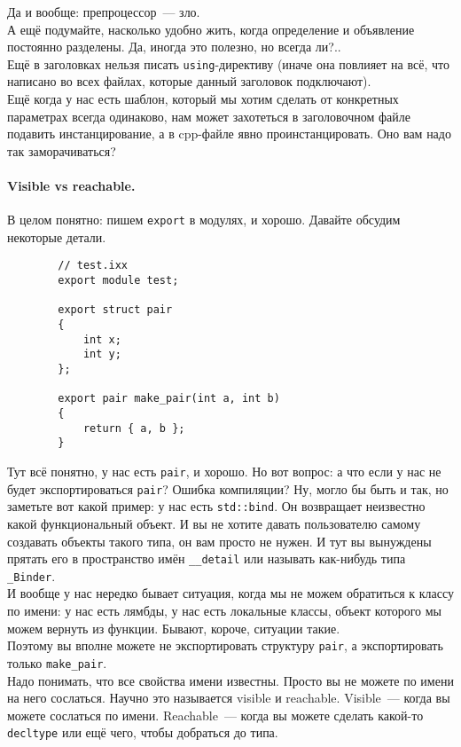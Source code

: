 \documentclass{article}
\begin{document}
    Да и вообще: препроцессор~--- зло.\\
    А ещё подумайте, насколько удобно жить, когда определение и объявление постоянно разделены. Да, иногда это полезно, но всегда ли?..\\
    Ещё в заголовках нельзя писать \texttt{using}-директиву (иначе она повлияет на всё, что написано во всех файлах, которые данный заголовок подключают).\\
    Ещё когда у нас есть шаблон, который мы хотим сделать от конкретных параметрах всегда одинаково, нам может захотеться в заголовочном файле подавить инстанцирование, а в cpp-файле явно проинстанцировать. Оно вам надо так заморачиваться?
    \paragraph{Visible vs reachable.}
    В целом понятно: пишем \texttt{export} в модулях, и хорошо. Давайте обсудим некоторые детали.
    \begin{verbatim}
        // test.ixx
        export module test;
        
        export struct pair
        {
            int x;
            int y;
        };

        export pair make_pair(int a, int b)
        {
            return { a, b };
        }
    \end{verbatim}
    Тут всё понятно, у нас есть \texttt{pair}, и хорошо. Но вот вопрос: а что если у нас не будет экспортироваться \texttt{pair}? Ошибка компиляции? Ну, могло бы быть и так, но заметьте вот какой пример: у нас есть \texttt{std::bind}. Он возвращает неизвестно какой функциональный объект. И вы не хотите давать пользователю самому создавать объекты такого типа, он вам просто не нужен. И тут вы вынуждены прятать его в пространство имён \texttt{__detail} или называть как-нибудь типа \texttt{_Binder}.\\
    И вообще у нас нередко бывает ситуация, когда мы не можем обратиться к классу по имени: у нас есть лямбды, у нас есть локальные классы, объект которого мы можем вернуть из функции. Бывают, короче, ситуации такие.\\
    Поэтому вы вполне можете не экспортировать структуру \texttt{pair}, а экспортировать только \texttt{make_pair}.\\
    Надо понимать, что все свойства имени известны. Просто вы не можете по имени на него сослаться. Научно это называется visible и reachable. Visible~--- когда вы можете сослаться по имени. Reachable~--- когда вы можете сделать какой-то \texttt{decltype} или ещё чего, чтобы добраться до типа.
\end{document}
